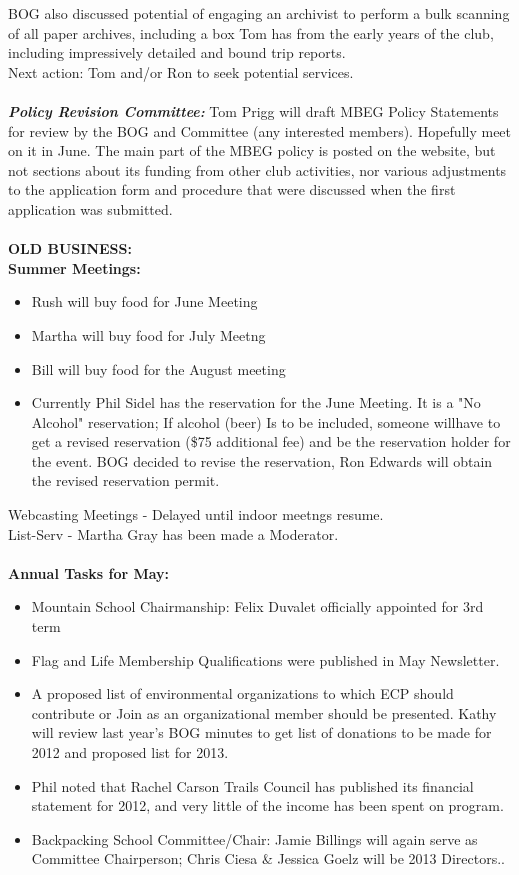 \documentclass[10pt,a4paper]{article}
\begin{document}
\begin{multicols}{2}
BOG also discussed potential of engaging an archivist to perform a bulk scanning of all paper archives, including a box Tom has from the early years of the club, including impressively detailed and bound trip reports.\\
Next action:  Tom and/or Ron to seek potential services.
\\
\\
\textit{\textbf{Policy Revision Committee:}}
Tom Prigg will draft MBEG Policy Statements for review by the BOG and Committee (any interested members).  Hopefully meet on it in June.  The main part of the MBEG policy is posted on the website, but not sections about its funding from other club activities, nor various adjustments to the application form and procedure that were discussed when the first application was submitted.
\\
\\
\textbf{OLD BUSINESS:}\\
\textbf{Summer Meetings:}
\begin{itemize}
\item Rush will buy food for June Meeting
\item Martha will buy food for July Meetng
\item Bill will buy food for the August meeting
\item Currently Phil Sidel has the reservation for the June Meeting. It is a "No Alcohol" reservation;  If alcohol (beer) Is to be included, someone willhave to get a revised reservation (\$75 additional fee) and be the reservation holder for the event.  BOG decided to revise the reservation,  Ron Edwards will obtain the 
  revised reservation permit.
\end{itemize}
Webcasting Meetings - Delayed until indoor meetngs resume.\\
List-Serv - Martha Gray has been made a Moderator.
\\
\\
\textbf{Annual Tasks for May:}
\begin{itemize}
\item Mountain School Chairmanship:  Felix Duvalet officially appointed for 3rd term
\item Flag and Life Membership Qualifications were published in May Newsletter.
\item A proposed list of environmental organizations to which ECP should contribute or Join as an organizational member should be presented.  Kathy will review last year's BOG minutes to get list of donations to be made for 2012 and proposed list for 2013.
\item Phil noted that Rachel Carson Trails Council  has published its financial statement for 2012, and very little of the income has been spent on program.
\item Backpacking School Committee/Chair:  Jamie Billings will again serve as Committee Chairperson;  Chris Ciesa \& Jessica Goelz  will be 2013 Directors..
\end{itemize}


\end{multicols}
\end{document}
